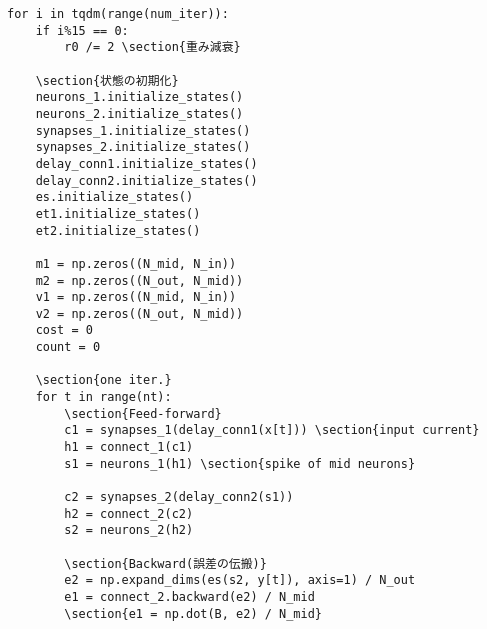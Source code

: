 \begin{verbatim}
for i in tqdm(range(num_iter)):
    if i%15 == 0:
        r0 /= 2 \section{重み減衰}
    
    \section{状態の初期化}
    neurons_1.initialize_states()
    neurons_2.initialize_states()
    synapses_1.initialize_states()
    synapses_2.initialize_states()
    delay_conn1.initialize_states()
    delay_conn2.initialize_states()
    es.initialize_states()
    et1.initialize_states()
    et2.initialize_states()
    
    m1 = np.zeros((N_mid, N_in))
    m2 = np.zeros((N_out, N_mid))
    v1 = np.zeros((N_mid, N_in))
    v2 = np.zeros((N_out, N_mid))
    cost = 0
    count = 0
    
    \section{one iter.}
    for t in range(nt):
        \section{Feed-forward}
        c1 = synapses_1(delay_conn1(x[t])) \section{input current}
        h1 = connect_1(c1)
        s1 = neurons_1(h1) \section{spike of mid neurons}
        
        c2 = synapses_2(delay_conn2(s1))
        h2 = connect_2(c2)
        s2 = neurons_2(h2)
        
        \section{Backward(誤差の伝搬)}
        e2 = np.expand_dims(es(s2, y[t]), axis=1) / N_out
        e1 = connect_2.backward(e2) / N_mid
        \section{e1 = np.dot(B, e2) / N_mid}

\end{verbatim}
